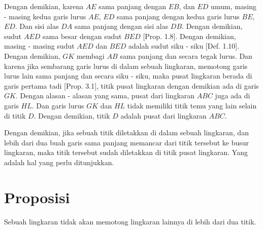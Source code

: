 \documentclass[a4paper]{book}
\begin{document}
Dengan demikian, karena $AE$ sama panjang dengan $EB$, dan $ED$ umum, masing - 
masing kedua garis lurus $AE$, $ED$ sama panjang dengan kedua garis lurus $BE$,
$ED$. Dan sisi alas $DA$ sama panjang dengan sisi alas $DB$. Dengan demikian,
sudut $AED$ sama besar dengan sudut $BED$ [Prop. 1.8]. Dengan demikian, masing - masing sudut $AED$ dan $BED$ adalah sudut siku - siku [Def. 1.10]. Dengan 
demikian, $GK$ membagi $AB$ sama panjang dan secara tegak lurus. Dan karena
jika sembarang garis lurus di dalam sebuah lingkaran, memotong garis lurus lain
sama panjang dan secara siku - siku, maka pusat lingkaran berada di garis
pertama tadi [Prop. 3.1], titik pusat lingkaran dengan demikian ada di garis
$GK$.  Dengan alasan - alasan yang sama, pusat dari lingkaran $ABC$ juga ada di
garis $HL$. Dan garis lurus $GK$ dan $HL$ tidak memiliki titik temu yang lain
selain di titik $D$. Dengan demikian, titik $D$ adalah pusat dari lingkaran
$ABC$.

Dengan demikian, jika sebuah titik diletakkan di dalam sebuah lingkaran, dan
lebih dari dua buah garis sama panjang memancar dari titik tersebut ke busur
lingkaran, maka titik tersebut sudah diletakkan di titik pusat lingkaran. Yang
adalah hal yang perlu ditunjukkan.

\section*{\centering Proposisi \thesection}
Sebuah lingkaran tidak akan memotong lingkaran lainnya di lebih dari
dua titik.

\begin{center}
\end{center}
\end{document}
